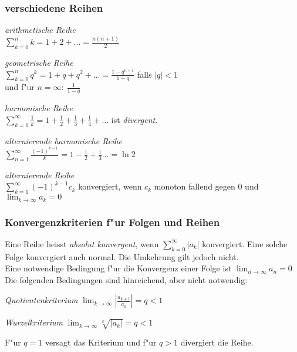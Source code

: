 \documentclass[10pt, a4paper, twocolumn]{scrartcl}
\begin{document}
\subsubsection{verschiedene Reihen}

\begin{description}
 \item \textit{arithmetische Reihe}\\
  $\sum^{n}_{k=0}k=1+2+\ldots=\frac{n(n+1)}{2}$
 \item \textit{geometrische Reihe}\\
  $\sum^{n}_{k=0}q^k=1+q+q^2+... = \frac{1-q^{n+1}}{1-q} $ falls $\mid q \mid < 1 $\\
  und f"ur $n=\infty:\:\frac{1}{1-q}$
 \item \textit{harmonische Reihe}\\
  $\sum^{\infty}_{k=1}\frac{1}{k}=1+\frac{1}{2}+\frac{1}{3}+\frac{1}{4}+\ldots$ ist \textit{divergent}.\\
 \item \textit{alternierende harmonische Reihe}\\
  $\sum^{\infty}_{n=1}\frac{(-1)^{k-1}}{k}=1-\frac{1}{2}+\frac{1}{3}\ldots=\ln 2$\\
 \item \textit{alternierende Reihe}\\
  $\sum^{\infty}_{k=1}(-1)^{k-1}c_k$ konvergiert, wenn $c_k$ monoton fallend gegen 0 und $\lim_{k\rightarrow \infty} a_k=0$
\end{description}

\subsubsection{Konvergenzkriterien f"ur Folgen und Reihen}

Eine Reihe heisst \textit{absolut konvergent}, wenn $\sum^\infty_{k=0}|a_k|$ konvergiert. Eine solche Folge konvergiert auch normal. Die Umkehrung gilt jedoch nicht.\\

Eine notwendige Bedingung f"ur die Konvergenz einer Folge ist $\lim_{n\rightarrow \infty}a_n=0$\\
Die folgenden Bedingungen sind hinreichend, aber nicht notwendig:
\begin{description}
 \item \textit{Quotientenkriterium}
  $\lim_{k\rightarrow \infty}|\frac{a_{k+1}}{a_k}|=q < 1$\\
 \item \textit{Wurzelkriterium}
  $\lim_{k\rightarrow \infty}\sqrt[k]{|a_k|}=q < 1$
\end{description}
F"ur $q=1$ versagt das Kriterium und f"ur $q>1$ divergiert die Reihe.
\end{document}
